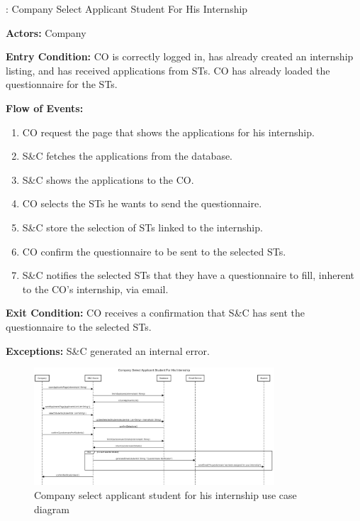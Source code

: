 \nextUseCaseID: Company Select Applicant Student For His Internship

\par \textbf{Actors:} Company

\par \textbf{Entry Condition:} CO is correctly logged in, has already created an internship listing, and has received applications from STs.
CO has already loaded the questionnaire for the STs.

\par \textbf{Flow of Events:}

\begin{enumerate}
    \item CO request the page that shows the applications for his internship.
    \item S\&C fetches the applications from the database.
    \item S\&C shows the applications to the CO.
    \item CO selects the STs he wants to send the questionnaire.
    \item S\&C store the selection of STs linked to the internship.
    \item CO confirm the questionnaire to be sent to the selected STs.
    \item S\&C notifies the selected STs that they have a questionnaire to fill, inherent to the CO's internship, via email.
\end{enumerate}

\par \textbf{Exit Condition:} CO receives a confirmation that S\&C has sent the questionnaire to the selected STs.

\par \textbf{Exceptions:} S\&C generated an internal error.

\par 
\begin{figure}[H]
    \centering
    \includegraphics[width=0.8\textwidth]{Images/UC_12.pdf}
    \caption{Company select applicant student for his internship use case diagram}
    \label{fig:use-case-diagram-12}
\end{figure}

